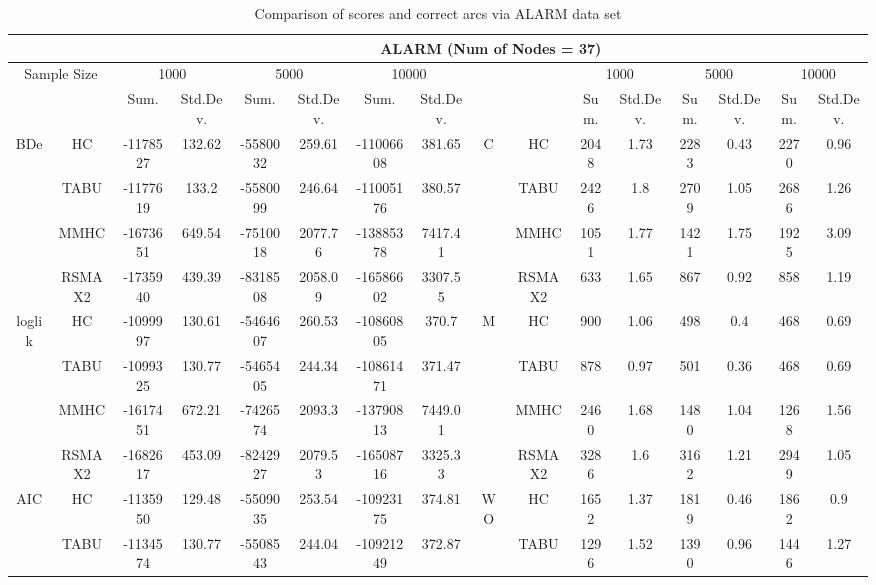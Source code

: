 \begin{table}[p]																										
\centering	\caption{Comparison of scores and correct arcs via ALARM data set}	\tiny																						
{\tabcolsep=0.01in																										
\begin{tabular}{cc||cc|cc|cc||cc|cc|cc|cc}																										
\hline																										
&	&	\multicolumn{14}{c}{ALARM	(Num	of	Nodes	=	37)}\tabularnewline																			
\hline																										
\multicolumn{2}{c||}{Sample	Size}	&	\multicolumn{2}{c|}{1000}	&	\multicolumn{2}{c|}{5000}	&	\multicolumn{2}{c||}{10000}	&	&	&	\multicolumn{2}{c|}{1000}	&	\multicolumn{2}{c|}{5000}	&	\multicolumn{2}{c}{10000}\tabularnewline											
\hline																										
&	&	Sum.	&	Std.Dev.	&	Sum.	&	Std.Dev.	&	Sum.	&	Std.Dev.	&	&	&	Sum.	&	Std.Dev.	&	Sum.	&	Std.Dev.	&	Sum.	&	Std.Dev.\tabularnewline
\hline																										
\hline																										
\multirow{4}{*}{BDe} & HC &	-1178527 & 	132.62 & 	-5580032 & 	259.61 & 	-11006608 & 	381.65 & 	\multirow{4}{*}{C} & HC &	2048 & 	1.73 & 	2283 & 	0.43 & 	2270 & 	0.96\tabularnewline													
& TABU &	-1177619 & 	133.2 & 	-5580099 & 	246.64 & 	-11005176 & 	380.57 & 	& TABU &	2426 & 	1.8 & 	2709 & 	1.05 & 	2686 & 	1.26\tabularnewline													
& MMHC &	-1673651 & 	649.54 & 	-7510018 & 	2077.76 & 	-13885378 & 	7417.41 & 	& MMHC &	1051 & 	1.77 & 	1421 & 	1.75 & 	1925 & 	3.09\tabularnewline													
& RSMAX2 &	-1735940 & 	439.39 & 	-8318508 & 	2058.09 & 	-16586602 & 	3307.55 & 	& RSMAX2 &	633 & 	1.65 & 	867 & 	0.92 & 	858 & 	1.19\tabularnewline													
\hline																										
\multirow{4}{*}{loglik} & HC &	-1099997 & 	130.61 & 	-5464607 & 	260.53 & 	-10860805 & 	370.7 & 	\multirow{4}{*}{M} & HC &	900 & 	1.06 & 	498 & 	0.4 & 	468 & 	0.69\tabularnewline													
& TABU &	-1099325 & 	130.77 & 	-5465405 & 	244.34 & 	-10861471 & 	371.47 & 	& TABU &	878 & 	0.97 & 	501 & 	0.36 & 	468 & 	0.69\tabularnewline													
& MMHC &	-1617451 & 	672.21 & 	-7426574 & 	2093.3 & 	-13790813 & 	7449.01 & 	& MMHC &	2460 & 	1.68 & 	1480 & 	1.04 & 	1268 & 	1.56\tabularnewline													
& RSMAX2 &	-1682617 & 	453.09 & 	-8242927 & 	2079.53 & 	-16508716 & 	3325.33 & 	& RSMAX2 &	3286 & 	1.6 & 	3162 & 	1.21 & 	2949 & 	1.05\tabularnewline													
\hline																										
\multirow{4}{*}{AIC} & HC &	-1135950 & 	129.48 & 	-5509035 & 	253.54 & 	-10923175 & 	374.81 & 	\multirow{4}{*}{WO} & HC &	1652 & 	1.37 & 	1819 & 	0.46 & 	1862 & 	0.9\tabularnewline													
& TABU &	-1134574 & 	130.77 & 	-5508543 & 	244.04 & 	-10921249 & 	372.87 & 	& TABU &	1296 & 	1.52 & 	1390 & 	0.96 & 	1446 & 	1.27\tabularnewline													

\end{tabular}}
\end{table}
